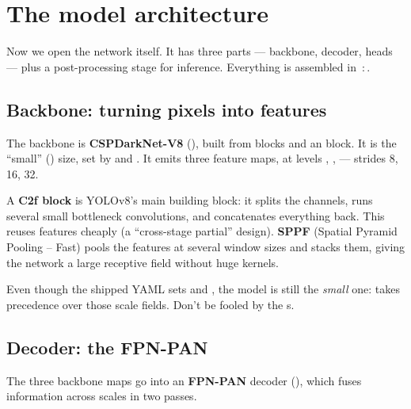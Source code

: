 \chapter{The model architecture}

Now we open the network itself. It has three parts --- backbone, decoder, heads --- plus a
post-processing stage for inference. Everything is assembled in
\,:\,.

\section{Backbone: turning pixels into features}
The backbone is \textbf{CSPDarkNet-V8} (), built from 
blocks and an  block. It is the ``small'' () size, set by
 and . It emits three feature maps, at
levels , ,  --- strides 8, 16, 32.

\begin{teacher}
A \textbf{C2f block} is YOLOv8's main building block: it splits the channels, runs several
small bottleneck convolutions, and concatenates everything back. This reuses features
cheaply (a ``cross-stage partial'' design). \textbf{SPPF} (Spatial Pyramid Pooling --
Fast) pools the features at several window sizes and stacks them, giving the network a
large receptive field without huge kernels.
\end{teacher}

\begin{pitfall}
Even though the shipped YAML sets  and ,
the model is still the \emph{small} one:  takes precedence
over those scale fields. Don't be fooled by the s.
\end{pitfall}

\section{Decoder: the FPN-PAN}
The three backbone maps go into an \textbf{FPN-PAN} decoder (),
which fuses information across scales in two passes.

